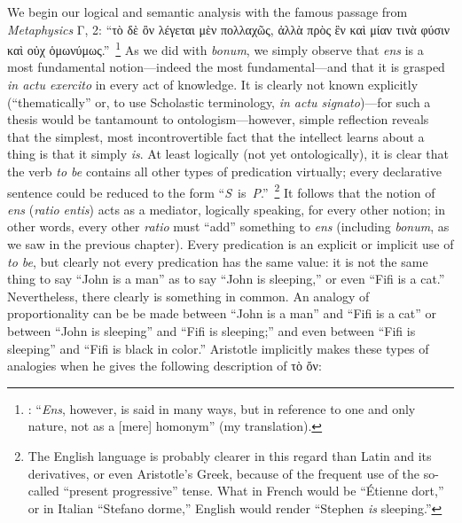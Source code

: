 We begin our logical and semantic analysis with the famous passage from \emph{Metaphysics} Γ, 2: “τὸ δὲ ὂν λέγεται μὲν πολλαχῶς, ἀλλὰ πρὸς ἓν καὶ μίαν τινὰ φύσιν καὶ οὐχ ὁμωνύμως.”\,%
%
\footnote{\Cite[Γ, 2, 1003a33-34]{aristotle:metaphysics}:  “\emph{Ens}, however, is said in many ways, but in reference to one and only nature, not as a [mere] homonym” (my translation).} As we did with \emph{bonum}, we simply observe that \emph{ens}  is a most fundamental notion—indeed the most fundamental—and that it is grasped \emph{in actu exercito} in every act of knowledge. It is clearly not known explicitly (“thematically” or, to use Scholastic terminology, \emph{in actu signato})—for such a thesis would be tantamount to ontologism—however, simple reflection reveals that the simplest, most incontrovertible fact that the intellect learns about a thing is that it simply \emph{is}. At least logically (not yet ontologically), it is clear that the verb \emph{to be} contains all other types of predication virtually; every declarative sentence could be reduced to the form “\emph{S}~is~\emph{P}.”\,%
%
\footnote{The English language is probably clearer in this regard than Latin and its derivatives, or even Aristotle’s Greek, because of the frequent use of the so-called “present progressive” tense. What in French would be “Étienne dort,” or in Italian “Stefano dorme,” English would render “Stephen \emph{is} sleeping.”} It follows that the notion of \emph{ens} (\emph{ratio entis}) acts as a mediator, logically speaking, for every other notion; in other words, every other \emph{ratio} must “add” something to \emph{ens} (including \emph{bonum}, as we saw in the previous chapter). Every predication is an explicit or implicit use of \emph{to be}, but clearly not every predication has the same value: it is not the same thing to say “John is a man” as to say “John is sleeping,” or even “Fifi is a cat.” Nevertheless, there clearly is something in common. An analogy of proportionality can be be made between “John is a man” and “Fifi is a cat” or between “John is sleeping” and “Fifi is sleeping;” and even between “Fifi is sleeping” and “Fifi is black in color.” Aristotle implicitly makes these types of analogies when he gives the following description of τὸ ὄν:

